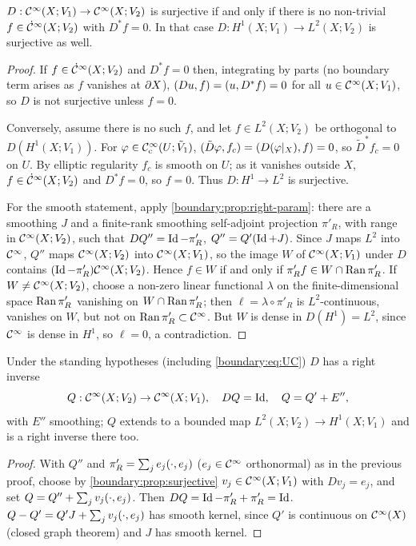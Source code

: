 \begin{proposition}\label{boundary:prop:surjective}
$D:\mathcal{C}^\infty(X;V_1)\to\mathcal{C}^\infty(X;V_2)$ is surjective if and only if there is no non-trivial
$f\in\dot{\mathcal{C}}^\infty(X;V_2)$ with $D^*f=0$. In that case $D:H^1(X;V_1)\to L^2(X;V_2)$ is
surjective as well.
\end{proposition}
\begin{proof}
If $f\in\dot{\mathcal{C}}^\infty(X;V_2)$ and $D^*f=0$ then, integrating by parts (no boundary term
arises as $f$ vanishes at $\partial X$), $( Du, f)=( u, D^*f)=0$ for all $u\in
\mathcal{C}^\infty(X;V_1)$, so $D$ is not surjective unless $f=0$.

Conversely, assume there is no such $f$, and let $f\in L^2(X;V_2)$ be orthogonal to
$D(H^1(X;V_1))$. For $\varphi\in\mathcal{C}^\infty_{\mathrm{c}}(U;\tilde V_1)$, $( \tilde D\varphi, f_c)=
( D(\varphi|_X), f)=0$, so $\tilde D^*f_c=0$ on $U$. By elliptic regularity $f_c$
is smooth on $U$; as it vanishes outside $X$, $f\in\dot{\mathcal{C}}^\infty(X;V_2)$ and $D^*f=0$, so
$f=0$. Thus $D:H^1\to L^2$ is surjective.

For the smooth statement, apply \cref{boundary:prop:right-param}: there are a
smoothing $J$ and a finite-rank smoothing self-adjoint projection $\pi'_R$, with
range in $\mathcal{C}^\infty(X;V_2)$, such that $DQ''=\operatorname{Id}-\pi'_R$, $Q''=Q'(\operatorname{Id}+J)$. Since $J$ maps
$L^2$ into $\mathcal{C}^\infty$, $Q''$ maps $\mathcal{C}^\infty(X;V_2)$ into $\mathcal{C}^\infty(X;V_1)$, so the image $W$ of
$\mathcal{C}^\infty(X;V_1)$ under $D$ contains $(\operatorname{Id}-\pi'_R)\mathcal{C}^\infty(X;V_2)$. Hence $f\in W$ if and only if
$\pi'_Rf\in W\cap\operatorname{Ran}\pi'_R$. If $W\ne\mathcal{C}^\infty(X;V_2)$, choose a non-zero linear functional
$\lambda$ on the finite-dimensional space $\operatorname{Ran}\pi'_R$ vanishing on $W\cap\operatorname{Ran}\pi'_R$;
then $\ell=\lambda\circ\pi'_R$ is $L^2$-continuous, vanishes on $W$, but not on
$\operatorname{Ran}\pi'_R\subset\mathcal{C}^\infty$. But $W$ is dense in $D(H^1)=L^2$, since $\mathcal{C}^\infty$ is dense in
$H^1$, so $\ell=0$, a contradiction.
\end{proof}

\begin{theorem}\label{boundary:thm:right-inverse}
Under the standing hypotheses (including \eqref{boundary:eq:UC}) $D$ has a right inverse
\begin{equation*}
Q:\mathcal{C}^\infty(X;V_2)\to\mathcal{C}^\infty(X;V_1),\quad DQ=\operatorname{Id},\quad Q=Q'+E'',
\end{equation*}
with $E''$ smoothing; $Q$ extends to a bounded map $L^2(X;V_2)\to H^1(X;V_1)$ and is a
right inverse there too.
\end{theorem}
\begin{proof}
With $Q''$ and $\pi'_R=\sum_je_j( \cdot, e_j)$ ($e_j\in\mathcal{C}^\infty$ orthonormal) as in the
previous proof, choose by \cref{boundary:prop:surjective} $v_j\in\mathcal{C}^\infty(X;V_1)$ with
$Dv_j=e_j$, and set $Q=Q''+\sum_jv_j( \cdot, e_j)$. Then $DQ=\operatorname{Id}-\pi'_R+\pi'_R=
\operatorname{Id}$. $Q-Q'=Q'J+\sum_jv_j( \cdot, e_j)$ has smooth kernel, since $Q'$ is continuous
on $\mathcal{C}^\infty(X)$ (closed graph theorem) and $J$ has smooth kernel.
\end{proof}

